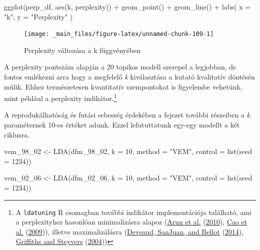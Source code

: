 \documentclass[
]{book}
\newenvironment{Shaded}{\begin{snugshade}}{\end{snugshade}}
\newcommand{\AttributeTok}[1]{\textcolor[rgb]{0.77,0.63,0.00}{#1}}
\newcommand{\DecValTok}[1]{\textcolor[rgb]{0.00,0.00,0.81}{#1}}
\newcommand{\FunctionTok}[1]{\textcolor[rgb]{0.00,0.00,0.00}{#1}}
\newcommand{\NormalTok}[1]{#1}
\newcommand{\OtherTok}[1]{\textcolor[rgb]{0.56,0.35,0.01}{#1}}
\newcommand{\SpecialCharTok}[1]{\textcolor[rgb]{0.00,0.00,0.00}{#1}}
\newcommand{\StringTok}[1]{\textcolor[rgb]{0.31,0.60,0.02}{#1}}
\begin{document}
\begin{Shaded}
\begin{Highlighting}[]
  \FunctionTok{ggplot}\NormalTok{(perp\_df, }\FunctionTok{aes}\NormalTok{(k, perplexity)) }\SpecialCharTok{+}
  \FunctionTok{geom\_point}\NormalTok{() }\SpecialCharTok{+}
  \FunctionTok{geom\_line}\NormalTok{() }\SpecialCharTok{+}
  \FunctionTok{labs}\NormalTok{(}
    \AttributeTok{x =} \StringTok{"k"}\NormalTok{,}
    \AttributeTok{y =} \StringTok{"Perplexity"}
\NormalTok{  )}
\end{Highlighting}
\end{Shaded}

\begin{figure}

{\centering \texttt{[image: \_main\_files/figure-latex/unnamed-chunk-109-1]} 

}

\caption{Perplexity változása a k függvényében}\label{fig:unnamed-chunk-109}
\end{figure}

A perplexity pontszám alapján a 20 topikos modell szerepel a legjobban,
de fontos emlékezni arra hogy a megfelelő \emph{k} kiválasztása a kutató
kvalitatív döntésén múlik. Ehhez természetesen kvantitatív szempontokat
is figyelembe vehetünk, mint például a perplexity indikátor.\footnote{A
  \texttt{ldatuning} R csomagban további indikátor implementációja
  található, ami a perplexityhez hasonlóan minimalizásra alapoz
  (\protect\hyperlink{ref-arun2010finding}{Arun et al.}
  (\protect\hyperlink{ref-arun2010finding}{2010}),
  \protect\hyperlink{ref-cao2009density}{Cao et al.}
  (\protect\hyperlink{ref-cao2009density}{2009})), illetve
  maximalizálásra (\protect\hyperlink{ref-deveaud2014accurate}{Deveaud,
  SanJuan, and Bellot}
  (\protect\hyperlink{ref-deveaud2014accurate}{2014}),
  \protect\hyperlink{ref-griffiths2004}{Griffiths and Steyvers}
  (\protect\hyperlink{ref-griffiths2004}{2004}))}

A reprodukálhatóság és futási sebesség érdekében a fejezet további
részeiben a \emph{k} paraméternek 10-es értéket adunk. Ezzel
lefututtatunk egy-egy modellt a két ciklusra.

\begin{Shaded}
\begin{Highlighting}[]
\NormalTok{vem\_98\_02 }\OtherTok{\textless{}{-}} \FunctionTok{LDA}\NormalTok{(dfm\_98\_02, }\AttributeTok{k =} \DecValTok{10}\NormalTok{, }\AttributeTok{method =} \StringTok{"VEM"}\NormalTok{, }\AttributeTok{control =} \FunctionTok{list}\NormalTok{(}\AttributeTok{seed =} \DecValTok{1234}\NormalTok{))}

\NormalTok{vem\_02\_06 }\OtherTok{\textless{}{-}} \FunctionTok{LDA}\NormalTok{(dfm\_02\_06, }\AttributeTok{k =} \DecValTok{10}\NormalTok{, }\AttributeTok{method =} \StringTok{"VEM"}\NormalTok{, }\AttributeTok{control =} \FunctionTok{list}\NormalTok{(}\AttributeTok{seed =} \DecValTok{1234}\NormalTok{))}
\end{Highlighting}
\end{Shaded}
\end{document}
